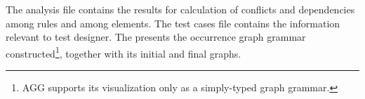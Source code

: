 The analysis file contains the results for calculation of conflicts and dependencies among rules and among elements. The test cases file contains the information relevant to test designer.
The  presents the occurrence graph grammar constructed\footnote{ AGG supports its visualization only as a simply-typed graph grammar.}, together with its initial and final graphs.

